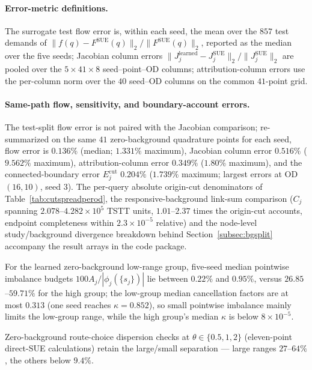 \paragraph{Error-metric definitions.}
The surrogate test flow error is, within each seed, the mean over the
$857$ test demands of
$\|f(q)-F^{\mathrm{SUE}}(q)\|_2/\|F^{\mathrm{SUE}}(q)\|_2$, reported
as the median over the five seeds; Jacobian column errors
$\|J_j^{\mathrm{learned}}-J_j^{\mathrm{SUE}}\|_2/\|J_j^{\mathrm{SUE}}\|_2$
are pooled over the $5\times41\times8$ seed--point--OD columns;
attribution-column errors use the per-column norm over the $40$
seed--OD columns on the common $41$-point grid.

\paragraph{Same-path flow, sensitivity, and boundary-account errors.}
The test-split flow error is not paired with the Jacobian comparison;
re-summarized on the same $41$ zero-background quadrature points for
each seed, flow error is $0.136\%$ (median; $1.331\%$ maximum),
Jacobian column error $0.516\%$ ($9.562\%$ maximum), attribution-column
error $0.349\%$ ($1.80\%$ maximum), and the connected-boundary error
$E_j^{\mathrm{cut}}$ $0.204\%$ ($1.739\%$ maximum; largest errors at
OD $(16,10)$, seed $3$). The per-query absolute origin-cut
denominators of Table~\ref{tab:cutspreadperod}, the responsive-background
link-sum comparison ($C_j$ spanning $2.078$--$4.282\times10^5$ TSTT
units, $1.01$--$2.37$ times the origin-cut accounts, endpoint
completeness within $2.3\times10^{-5}$ relative) and the node-level
study/background divergence breakdown behind
Section~\ref{subsec:bgsplit} accompany the result arrays in the code
package.

For the learned zero-background low-range group, five-seed median pointwise
imbalance budgets $100A_j/|\phi_j(\{s_j\})|$ lie between $0.22\%$ and
$0.95\%$, versus $26.85$--$59.71\%$ for the high group; the low-group
median cancellation factors are at most $0.313$ (one seed reaches
$\kappa=0.852$), so small pointwise imbalance mainly limits the
low-group range, while the high group's median $\kappa$ is below
$8\times10^{-5}$.

Zero-background route-choice dispersion checks at $\theta\in\{0.5,1,2\}$
(eleven-point direct-SUE calculations) retain the large/small
separation --- large ranges $27$--$64\%$, the others below $9.4\%$.

